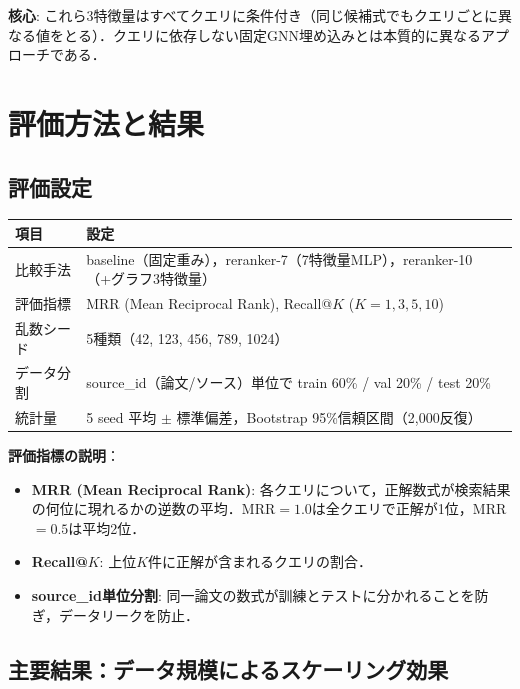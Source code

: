 \documentclass[11pt,a4paper]{ltjsarticle}
\begin{document}
\textbf{核心}: これら3特徴量はすべてクエリに条件付き（同じ候補式でもクエリごとに異なる値をとる）．クエリに依存しない固定GNN埋め込みとは本質的に異なるアプローチである．

\section{評価方法と結果}

\subsection{評価設定}

\begin{table}[h]
\centering
\begin{tabular}{lp{10cm}}
\toprule
項目 & 設定 \\
\midrule
比較手法 & baseline（固定重み），reranker-7（7特徴量MLP），reranker-10（+グラフ3特徴量） \\
評価指標 & MRR (Mean Reciprocal Rank), Recall@$K$ ($K=1,3,5,10$) \\
乱数シード & 5種類（42, 123, 456, 789, 1024） \\
データ分割 & source\_id（論文/ソース）単位で train 60\% / val 20\% / test 20\% \\
統計量 & 5 seed 平均 $\pm$ 標準偏差，Bootstrap 95\%信頼区間（2,000反復） \\
\bottomrule
\end{tabular}
\end{table}

\textbf{評価指標の説明}：
\begin{itemize}[nosep]
  \item \textbf{MRR (Mean Reciprocal Rank)}: 各クエリについて，正解数式が検索結果の何位に現れるかの逆数の平均．MRR$=1.0$は全クエリで正解が1位，MRR$=0.5$は平均2位．
  \item \textbf{Recall@$K$}: 上位$K$件に正解が含まれるクエリの割合．
  \item \textbf{source\_id単位分割}: 同一論文の数式が訓練とテストに分かれることを防ぎ，データリークを防止．
\end{itemize}

\subsection{主要結果：データ規模によるスケーリング効果}
\end{document}
